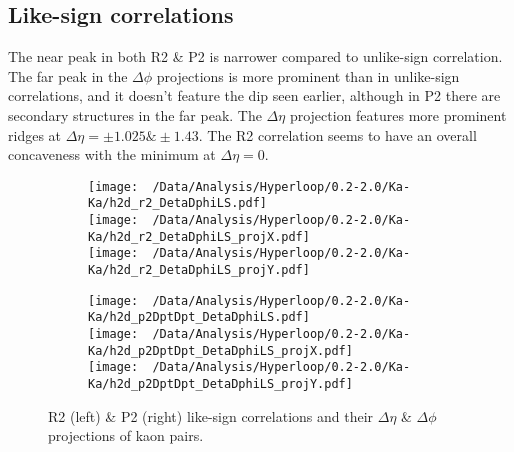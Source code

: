 \documentclass[12pt,a4paper,twoside]{report}
\begin{document}
\subsection{Like-sign correlations}
The near peak in both R2 \& P2 is narrower compared to unlike-sign correlation. The far peak in the $\Delta\phi$ projections is more prominent than in unlike-sign correlations, and it doesn't feature the dip seen earlier, although in P2 there are secondary structures in the far peak. The $\Delta\eta$ projection features more prominent ridges at $\Delta\eta=\pm1.025\&\pm1.43$. The R2 correlation seems to have an overall concaveness with the minimum at $\Delta\eta=0$.
\begin{figure}[H]
	\begin{subfigure}{0.49\linewidth}
		\texttt{[image: ~/Data/Analysis/Hyperloop/0.2-2.0/Ka-Ka/h2d\_r2\_DetaDphiLS.pdf]}\\
		\texttt{[image: ~/Data/Analysis/Hyperloop/0.2-2.0/Ka-Ka/h2d\_r2\_DetaDphiLS\_projX.pdf]}\\
		\texttt{[image: ~/Data/Analysis/Hyperloop/0.2-2.0/Ka-Ka/h2d\_r2\_DetaDphiLS\_projY.pdf]}\\
	\end{subfigure}
	\begin{subfigure}{0.49\linewidth}
		\texttt{[image: ~/Data/Analysis/Hyperloop/0.2-2.0/Ka-Ka/h2d\_p2DptDpt\_DetaDphiLS.pdf]}\\
		\texttt{[image: ~/Data/Analysis/Hyperloop/0.2-2.0/Ka-Ka/h2d\_p2DptDpt\_DetaDphiLS\_projX.pdf]}\\
		\texttt{[image: ~/Data/Analysis/Hyperloop/0.2-2.0/Ka-Ka/h2d\_p2DptDpt\_DetaDphiLS\_projY.pdf]}\\
	\end{subfigure}
	\caption{R2 (left) \& P2 (right) like-sign correlations and their $\Delta\eta$ \& $\Delta\phi$ projections of kaon pairs.}
\end{figure}
\end{document}
